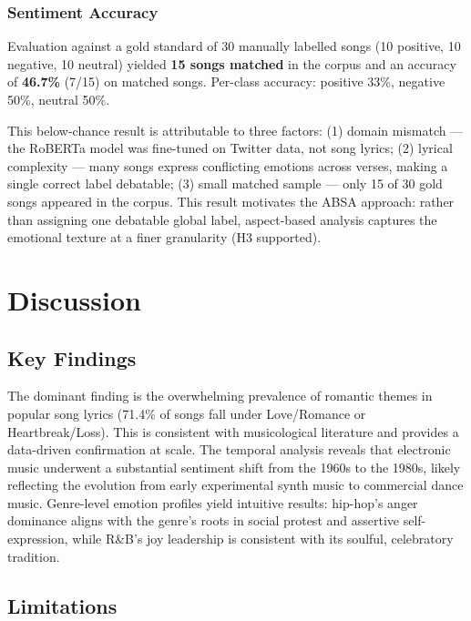 \documentclass[pdflatex,sn-mathphys-num]{sn-jnl}
\begin{document}
\subsubsection{Sentiment Accuracy}\label{subsubsec7}

Evaluation against a gold standard of 30 manually labelled songs (10 positive, 10 negative, 10 neutral) yielded \textbf{15 songs matched} in the corpus and an accuracy of \textbf{46.7\%} (7/15) on matched songs. Per-class accuracy: positive 33\%, negative 50\%, neutral 50\%.

This below-chance result is attributable to three factors: (1) domain mismatch --- the RoBERTa model was fine-tuned on Twitter data, not song lyrics; (2) lyrical complexity --- many songs express conflicting emotions across verses, making a single correct label debatable; (3) small matched sample --- only 15 of 30 gold songs appeared in the corpus. This result motivates the ABSA approach: rather than assigning one debatable global label, aspect-based analysis captures the emotional texture at a finer granularity (H3 supported).

\section{Discussion}\label{sec6}

\subsection{Key Findings}\label{subsec13}

The dominant finding is the overwhelming prevalence of romantic themes in popular song lyrics (71.4\% of songs fall under Love/Romance or Heartbreak/Loss). This is consistent with musicological literature and provides a data-driven confirmation at scale. The temporal analysis reveals that electronic music underwent a substantial sentiment shift from the 1960s to the 1980s, likely reflecting the evolution from early experimental synth music to commercial dance music. Genre-level emotion profiles yield intuitive results: hip-hop's anger dominance aligns with the genre's roots in social protest and assertive self-expression, while R\&B's joy leadership is consistent with its soulful, celebratory tradition.

\subsection{Limitations}\label{subsec14}
\end{document}
